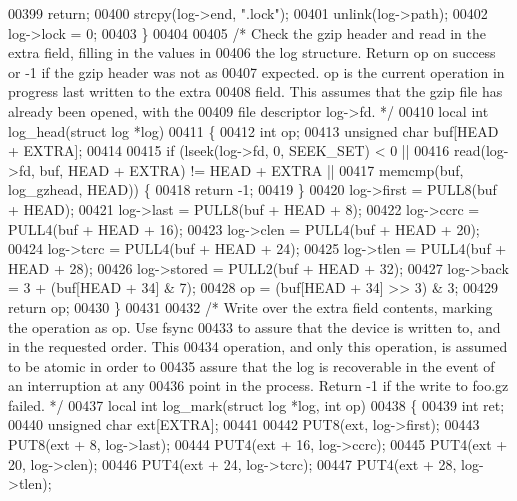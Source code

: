 \begin{DoxyCode}
00399         \textcolor{keywordflow}{return};
00400     strcpy(log->end, \textcolor{stringliteral}{".lock"});
00401     unlink(log->path);
00402     log->lock = 0;
00403 \}
00404 
00405 \textcolor{comment}{/* Check the gzip header and read in the extra field, filling in the values in}
00406 \textcolor{comment}{   the log structure.  Return op on success or -1 if the gzip header was not as}
00407 \textcolor{comment}{   expected.  op is the current operation in progress last written to the extra}
00408 \textcolor{comment}{   field.  This assumes that the gzip file has already been opened, with the}
00409 \textcolor{comment}{   file descriptor log->fd. */}
00410 local \textcolor{keywordtype}{int} log\_head(\textcolor{keyword}{struct} log *log)
00411 \{
00412     \textcolor{keywordtype}{int} op;
00413     \textcolor{keywordtype}{unsigned} \textcolor{keywordtype}{char} buf[HEAD + EXTRA];
00414 
00415     \textcolor{keywordflow}{if} (lseek(log->fd, 0, SEEK\_SET) < 0 ||
00416         read(log->fd, buf, HEAD + EXTRA) != HEAD + EXTRA ||
00417         memcmp(buf, log\_gzhead, HEAD)) \{
00418         \textcolor{keywordflow}{return} -1;
00419     \}
00420     log->first = PULL8(buf + HEAD);
00421     log->last = PULL8(buf + HEAD + 8);
00422     log->ccrc = PULL4(buf + HEAD + 16);
00423     log->clen = PULL4(buf + HEAD + 20);
00424     log->tcrc = PULL4(buf + HEAD + 24);
00425     log->tlen = PULL4(buf + HEAD + 28);
00426     log->stored = PULL2(buf + HEAD + 32);
00427     log->back = 3 + (buf[HEAD + 34] & 7);
00428     op = (buf[HEAD + 34] >> 3) & 3;
00429     \textcolor{keywordflow}{return} op;
00430 \}
00431 
00432 \textcolor{comment}{/* Write over the extra field contents, marking the operation as op.  Use fsync}
00433 \textcolor{comment}{   to assure that the device is written to, and in the requested order.  This}
00434 \textcolor{comment}{   operation, and only this operation, is assumed to be atomic in order to}
00435 \textcolor{comment}{   assure that the log is recoverable in the event of an interruption at any}
00436 \textcolor{comment}{   point in the process.  Return -1 if the write to foo.gz failed. */}
00437 local \textcolor{keywordtype}{int} log\_mark(\textcolor{keyword}{struct} log *log, \textcolor{keywordtype}{int} op)
00438 \{
00439     \textcolor{keywordtype}{int} ret;
00440     \textcolor{keywordtype}{unsigned} \textcolor{keywordtype}{char} ext[EXTRA];
00441 
00442     PUT8(ext, log->first);
00443     PUT8(ext + 8, log->last);
00444     PUT4(ext + 16, log->ccrc);
00445     PUT4(ext + 20, log->clen);
00446     PUT4(ext + 24, log->tcrc);
00447     PUT4(ext + 28, log->tlen);

\end{DoxyCode}
